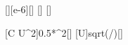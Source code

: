 [\micro\farad][e-6][\farad]
[\V]
[\henry]

[C U^2]{0.5*\CaX*\UcX^2}[\joule]
[U]{\UcX*sqrt(\CaX/\LcX)}[\ampere]

